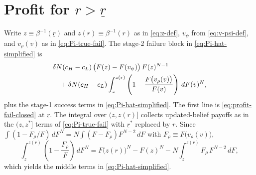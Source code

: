 \section{Profit for \texorpdfstring{$r>\underline{r}$}{r above underline r}}
\label{app:profit-above}

Write $z\equiv\beta^{-1}(\underline{r})$ and $z(r)\equiv\beta^{-1}(r)$ as in
\eqref{eq:z-def}, $v_{\psi}$ from \eqref{eq:v-psi-def}, and
$v_{\rho}(v)$ as in \eqref{eq:Pi-true-fail}.
The stage-2 failure block in \eqref{eq:Pi-hat-simplified} is
\begin{align}
  &\delta N (c_H - c_L)\,
    \bigl(F(z) - F(v_{\psi})\bigr)\,
    F(z)^{N-1}
  \notag\\
  &\quad + \delta N (c_H - c_L)
    \int_{z}^{z(r)}
      \left(1 - \frac{F\bigl(v_{\rho}(v)\bigr)}{F(v)}\right)\, dF(v)^{N},
  \label{eq:Pi-hat-initial}
\end{align}
plus the stage-1 success terms in \eqref{eq:Pi-hat-simplified}.
The first line is \eqref{eq:profit-fail-closed} at $\underline{r}$.
The integral over $(z,z(r)]$ collects updated-belief payoffs as in the
$(z,z^{*}]$ terms of \eqref{eq:Pi-true-fail} with $\underline{r}^{*}$ replaced
by $r$.
Since
$\int (1-F_{\rho}/F)\,dF^{N}
= N\int (F-F_{\rho})F^{N-2}\,dF$ with $F_{\rho}\equiv F\bigl(v_{\rho}(v)\bigr)$,
\begin{equation*}
  \int_{z}^{z(r)}
    \left(1 - \frac{F_{\rho}}{F}\right)\, dF^{N}
  = F\bigl(z(r)\bigr)^{N}
    - F(z)^{N}
    - N \int_{z}^{z(r)}
      F_{\rho}\,F^{N-2}\, dF,
\end{equation*}
which yields the middle terms in \eqref{eq:Pi-hat-simplified}.
